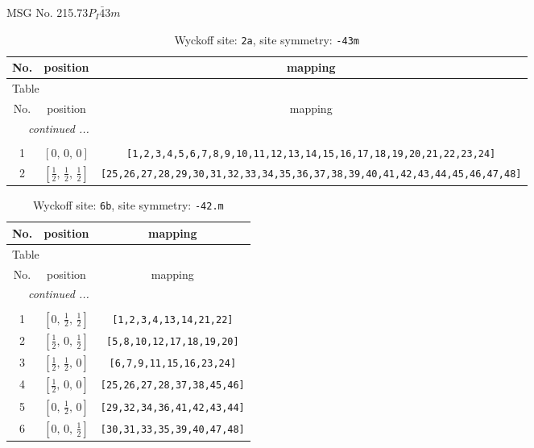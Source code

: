 \documentclass[fleqn,8pt]{jsarticle}
\begin{document}
\setcounter{MaxMatrixCols}{32}

\renewcommand{\tablename}{Table~}
\renewcommand{\figurename}{Figure~}
\begin{center}
\LARGE
MSG No. 215.73\quad$P_{I}\bar{4}3m$
\end{center}
\renewcommand{\arraystretch}{1.2}
\begin{longtable}{ccc}
\caption{Wyckoff site: {\tt 2a}, site symmetry: {\tt -43m}}
 \\
 \hline \hline
No. & position & mapping \\ \hline \endfirsthead

\multicolumn{2}{l}{\tablename\ \thetable{}} \\
 \hline \hline
No. & position & mapping \\ \hline \endhead

 \hline \hline
\multicolumn{2}{r}{\footnotesize\it continued ...} \\ \endfoot

 \hline \hline
\multicolumn{2}{r}{} \\ \endlastfoot

1 & $\left[ 0,\, 0,\, 0 \right]$ & {\tt [1,2,3,4,5,6,7,8,9,10,11,12,13,14,15,16,17,18,19,20,21,22,23,24]} \\ \hline
2 & $\left[ \frac{1}{2},\, \frac{1}{2},\, \frac{1}{2} \right]$ & {\tt [25,26,27,28,29,30,31,32,33,34,35,36,37,38,39,40,41,42,43,44,45,46,47,48]} \\
\end{longtable}
\renewcommand{\arraystretch}{1.2}
\begin{longtable}{ccc}
\caption{Wyckoff site: {\tt 6b}, site symmetry: {\tt -42.m}}
 \\
 \hline \hline
No. & position & mapping \\ \hline \endfirsthead

\multicolumn{2}{l}{\tablename\ \thetable{}} \\
 \hline \hline
No. & position & mapping \\ \hline \endhead

 \hline \hline
\multicolumn{2}{r}{\footnotesize\it continued ...} \\ \endfoot

 \hline \hline
\multicolumn{2}{r}{} \\ \endlastfoot

1 & $\left[ 0,\, \frac{1}{2},\, \frac{1}{2} \right]$ & {\tt [1,2,3,4,13,14,21,22]} \\ \hline
2 & $\left[ \frac{1}{2},\, 0,\, \frac{1}{2} \right]$ & {\tt [5,8,10,12,17,18,19,20]} \\ \hline
3 & $\left[ \frac{1}{2},\, \frac{1}{2},\, 0 \right]$ & {\tt [6,7,9,11,15,16,23,24]} \\ \hline
4 & $\left[ \frac{1}{2},\, 0,\, 0 \right]$ & {\tt [25,26,27,28,37,38,45,46]} \\ \hline
5 & $\left[ 0,\, \frac{1}{2},\, 0 \right]$ & {\tt [29,32,34,36,41,42,43,44]} \\ \hline
6 & $\left[ 0,\, 0,\, \frac{1}{2} \right]$ & {\tt [30,31,33,35,39,40,47,48]} \\
\end{longtable}
\end{document}
